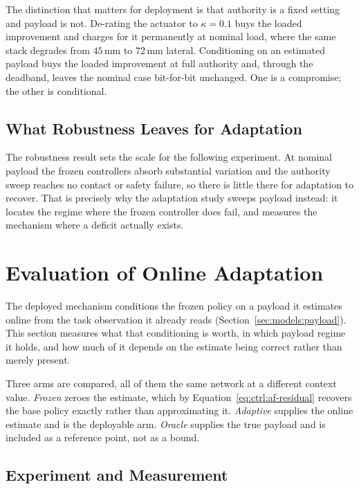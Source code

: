 The distinction that matters for deployment is that authority is a fixed setting
and payload is not. De-rating the actuator to $\kappa=0.1$ buys the loaded
improvement and charges for it permanently at nominal load, where the same stack
degrades from $45$\,mm to $72$\,mm lateral. Conditioning on an estimated payload
buys the loaded improvement at full authority and, through the deadband, leaves
the nominal case bit-for-bit unchanged. One is a compromise; the other is
conditional.

\subsection{What Robustness Leaves for Adaptation}
\label{sec:eval:robustness-residual}

The robustness result sets the scale for the following experiment. At nominal
payload the frozen controllers absorb substantial variation and the authority
sweep reaches no contact or safety failure, so there is little there for
adaptation to recover. That is precisely why the adaptation study sweeps
payload instead: it locates the regime where the frozen controller does fail,
and measures the mechanism where a deficit actually exists.

\section{Evaluation of Online Adaptation}
\label{sec:eval:adaptation}

The deployed mechanism conditions the frozen policy on a payload it estimates
online from the task observation it already reads
(Section~\ref{sec:models:payload}). This section measures what that conditioning
is worth, in which payload regime it holds, and how much of it depends on the
estimate being correct rather than merely present.

Three arms are compared, all of them the same network at a different context
value. \emph{Frozen} zeroes the estimate, which by
Equation~\eqref{eq:ctrl:af-residual} recovers the base policy exactly rather
than approximating it. \emph{Adaptive} supplies the online estimate and is the
deployable arm. \emph{Oracle} supplies the true payload and is included as a
reference point, not as a bound.

\subsection{Experiment and Measurement}
\label{sec:eval:instrument}

